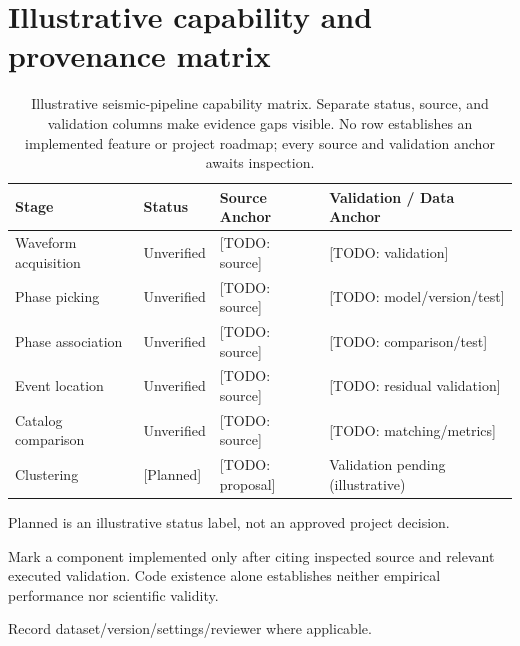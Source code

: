 \documentclass{article}
\begin{document}
\section*{Illustrative capability and provenance matrix}

\begin{table}[htbp]
  \centering
  \small
  \begin{threeparttable}
    \caption{Illustrative seismic-pipeline capability matrix.
      Separate status, source, and validation columns make evidence gaps
      visible. No row establishes an implemented feature or project roadmap;
      every source and validation anchor awaits inspection.}
    \label{tab:pipeline-capability}
    \begin{tabularx}{\linewidth}{@{} X l X X @{}}
      \toprule
      \textbf{Stage} & \textbf{Status} & \textbf{Source Anchor}
        & \textbf{Validation / Data Anchor} \\
      \midrule
      Waveform acquisition & Unverified & [TODO: source]
        & [TODO: validation] \\
      Phase picking & Unverified & [TODO: source]
        & [TODO: model/version/test] \\
      Phase association & Unverified & [TODO: source]
        & [TODO: comparison/test] \\
      Event location & Unverified & [TODO: source]
        & [TODO: residual validation] \\
      Catalog comparison & Unverified & [TODO: source]
        & [TODO: matching/metrics] \\
      Clustering & [Planned]\tnote{a} & [TODO: proposal]
        & Validation pending (illustrative) \\
      \bottomrule
    \end{tabularx}
    \begin{tablenotes}[flushleft]
      \footnotesize
      \item[a] Planned is an illustrative status label, not an approved
      project decision.
      \item Mark a component implemented only after citing inspected source
      and relevant executed validation. Code existence alone establishes
      neither empirical performance nor scientific validity.
      \item Record dataset/version/settings/reviewer where applicable.
    \end{tablenotes}
  \end{threeparttable}
\end{table}
\end{document}
